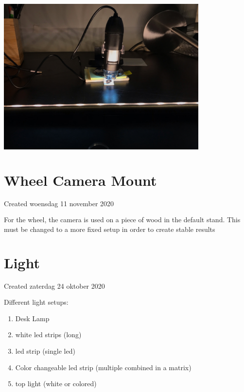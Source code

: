 \documentclass{article}
\begin{document}
\includegraphics[height=3.125000in, keepaspectratio=true]{./ZimFiles_files/Camera_setup/Camera_mount/First_Camera_Mount/eerste_setup_andere_richting.jpeg}




		\section{Wheel Camera Mount}

Created woensdag 11 november 2020



For the wheel, the camera is used on a piece of wood in the default stand. This must be changed to a more fixed setup in order to create stable results


		\section{Light}

Created zaterdag 24 oktober 2020



Different light setups:

\begin{enumerate}[1]
\item Desk Lamp
\item white led strips (long) 
\item  led strip (single led)
\item Color changeable led strip (multiple combined in a matrix)
\item top light (white or colored)
\end{enumerate}
\end{document}

